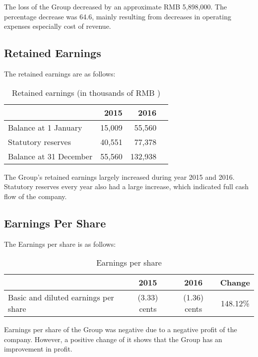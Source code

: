 The loss of the Group decreased by an approximate RMB 5,898,000. The percentage  decrease was 64.6, mainly resulting from decreases in operating expenses especially cost of revenue.

\subsection{Retained Earnings }

The retained earnings are as follows:

\begin{table}[H]	
	\begin{center}
		\begin{tabular}{lrrr}
			\toprule
			&\textbf{2015}&\textbf{2016}\\
			\midrule
			Balance at 1 January&	15,009&	55,560\\
			Statutory reserves&	40,551&	77,378\\
			Balance at 31 December&	55,560&	132,938\\
			\bottomrule
		\end{tabular}
	\end{center}
	\caption{Retained earnings (in thousands of RMB \textyen)}\label{table:1}
\end{table}

The Group’s retained earnings largely increased during year 2015 and 2016. Statutory reserves every year also had a large increase, which indicated full cash flow of the company.

\subsection{Earnings Per Share}
	The Earnings per share is as follows:
\begin{table}[H]	
	\begin{center}
		\begin{tabular}{lccc}
			\toprule
			&\textbf{2015}&\textbf{2016}&\textbf{Change}\\
			\midrule
			Basic and diluted earnings per share&(3.33) cents&(1.36) cents&148.12\%\\
			\bottomrule
		\end{tabular}
	\end{center}
	\caption{Earnings per share}\label{table:1}
\end{table}

Earnings per share of the Group was negative due to a negative profit of the company. However, a positive change of it shows that the Group has an improvement in profit.

